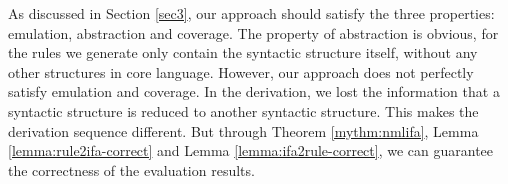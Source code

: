 
As discussed in Section \ref{sec3}, our approach should satisfy the three properties: emulation, abstraction and coverage. The property of abstraction is obvious, for the rules we generate only contain the syntactic structure itself, without any other structures in core language. However, our approach does not perfectly satisfy emulation and coverage. In the derivation, we lost the information that a syntactic structure is reduced to another syntactic structure. This makes the derivation sequence different. But through Theorem \ref{mythm:nmlifa}, Lemma \ref{lemma:rule2ifa-correct} and Lemma \ref{lemma:ifa2rule-correct}, we can guarantee the correctness of the evaluation results.
